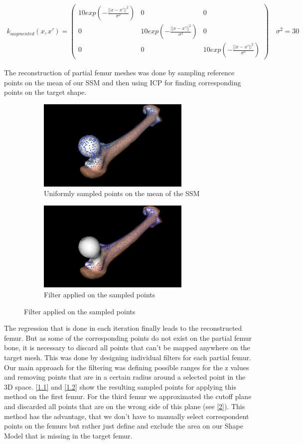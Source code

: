 \documentclass{article}
\begin{document}
	\begin{align}
	k_{augmented}(x, x') =
	\begin{pmatrix}
	10 exp(-\frac{||x-x'||^2}{\sigma^2})       & 0 & 0 \\
	0      & 10 exp(-\frac{||x-x'||^2}{\sigma^2}) & 0  \\
	0      & 0 &  10 exp(-\frac{||x-x'||^2}{\sigma^2})
	\end{pmatrix}
	\quad \sigma^2 = 30
	\label{eq:2}
	\end{align}
	
	The reconstruction of partial femur meshes was done by sampling reference points on the mean of our SSM and then using ICP for finding corresponding points on the target shape. \\
	\begin{figure}
		\begin{subfigure}{.5\textwidth}
		\centering
		\includegraphics[width=7.3cm]{1.jpg}
		\caption{Uniformly sampled points on the mean of the SSM}
		
		\label{1.1}
	\end{subfigure}	
	\begin{subfigure}{.5\textwidth}
		\centering
		 \includegraphics[width=7.3cm]{2.jpg}
		\caption{Filter applied on the sampled points}
		\label{1.2}
	\end{subfigure}	
	\end{figure}
	
	The regression that is done in each iteration finally leads to the reconstructed femur. But as some of the corresponding points do not exist on the partial femur bone, it is necessary to discard all points that can’t be mapped anywhere on the target mesh. This was done by designing individual filters for each partial femur. 
	Our main approach for the filtering was defining possible ranges for the z values and removing points that are in a certain radius around a selected point in the 3D space. \autoref{1.1} and \autoref{1.2} show the resulting sampled points for applying this method on the first femur. For the third femur we approximated the cutoff plane and discarded all points that are on the wrong side of this plane (see \autoref{2}).
	This method has the advantage, that we don't have to manually select correspondent points on the femurs but rather just define and exclude the area on our Shape Model that is missing in the target femur.
	
\end{document}
